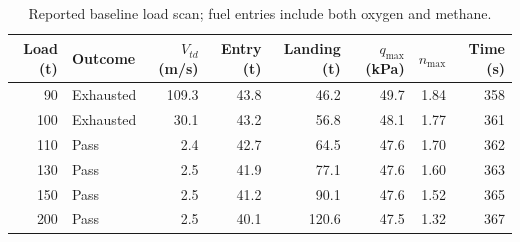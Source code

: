 \begin{table}[htbp]
\caption{Reported baseline load scan; fuel entries include both oxygen and methane.}
\label{tab:src2}
\small
\setlength{\tabcolsep}{3.5pt}
\begin{tabularx}{\linewidth}{@{}rlrrrrrr@{}}
\toprule
Load (t) & Outcome & $V_{td}$ (m/s) & Entry (t) & Landing (t) & $q_{\max}$ (kPa) & $n_{\max}$ & Time (s) \\
\midrule
90 & Exhausted & 109.3 & 43.8 & 46.2 & 49.7 & 1.84 & 358 \\
100 & Exhausted & 30.1 & 43.2 & 56.8 & 48.1 & 1.77 & 361 \\
110 & Pass & 2.4 & 42.7 & 64.5 & 47.6 & 1.70 & 362 \\
130 & Pass & 2.5 & 41.9 & 77.1 & 47.6 & 1.60 & 363 \\
150 & Pass & 2.5 & 41.2 & 90.1 & 47.6 & 1.52 & 365 \\
200 & Pass & 2.5 & 40.1 & 120.6 & 47.5 & 1.32 & 367 \\
\bottomrule
\end{tabularx}
\end{table}
